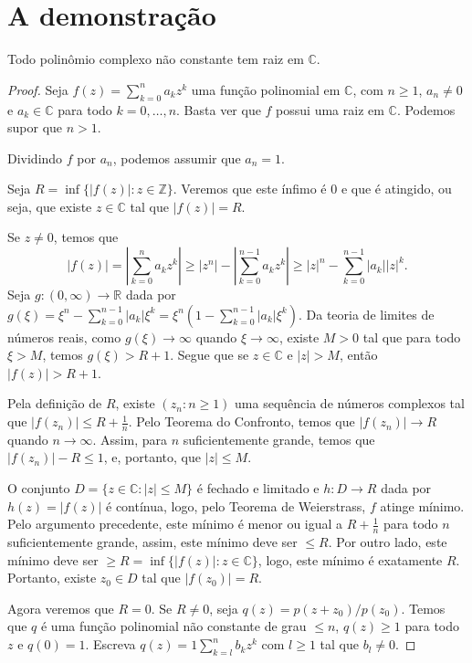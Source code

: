 \section{A demonstração}
\begin{theorem}
    Todo polinômio complexo não constante tem raiz em $\mathbb C$.
\end{theorem}
\begin{proof}
    Seja $f(z)=\sum_{k=0}^n a_k z^k$ uma função polinomial em $\mathbb C$, com $n\geq 1$, $a_n\neq 0$ e $a_k\in \mathbb C$ para todo $k=0,\ldots,n$.
    Basta ver que $f$ possui uma raiz em $\mathbb C$. Podemos supor que $n>1$.

    Dividindo $f$ por $a_n$, podemos assumir que $a_n=1$.

    Seja $R=\inf\{|f(z)|: z \in \mathbb Z\}$. Veremos que este ínfimo é $0$ e que é atingido, ou seja, que existe $z \in \mathbb C$ tal que $|f(z)|=R$.

    Se $z\neq 0$, temos que
    \begin{equation}
    |f(z)|=\left|\sum_{k=0}^n a_k z^k\right|\geq |z^n|-\left|\sum_{k=0}^{n-1}a_k z^k\right|\geq|z|^n-\sum_{k=0}^{n-1}|a_k||z|^k.
    \end{equation}
    Seja $g:(0, \infty)\rightarrow \mathbb R$ dada por $g(\xi)=\xi^n-\sum_{k=0}^{n-1}|a_k|\xi^k=\xi^n(1-\sum_{k=0}^{n-1}|a_k|\xi^k)$.
    Da teoria de limites de números reais, como $g(\xi)\to\infty$ quando $\xi\to \infty$, existe $M>0$ tal que para todo $\xi>M$, temos $g(\xi)>R+1$. Segue que se $z \in \mathbb C$ e $|z|>M$, então $|f(z)|>R+1$.

    Pela definição de $R$, existe $(z_n: n\geq 1)$ uma sequência de números complexos tal que $|f(z_n)|\leq R+\frac{1}{n}$. Pelo Teorema do Confronto, temos que $|f(z_n)|\to R$ quando $n\to \infty$. Assim, para $n$ suficientemente grande, temos que $|f(z_n)|-R\leq 1$, e, portanto, que $|z|\leq M$.

    O conjunto $D=\{z \in \mathbb C: |z|\leq M\}$ é fechado e limitado e $h:D\rightarrow R$ dada por $h(z)=|f(z)|$ é contínua, logo, pelo Teorema de Weierstrass, $f$ atinge mínimo. Pelo argumento precedente, este mínimo é menor ou igual a $R+\frac{1}{n}$ para todo $n$ suficientemente grande, assim, este mínimo deve ser $\leq R$. Por outro lado, este mínimo deve ser $\geq R=\inf\{|f(z)|: z \in \mathbb C\}$, logo, este mínimo é exatamente $R$. Portanto, existe $z_0 \in D$ tal que $|f(z_0)|=R$.

    Agora veremos que $R=0$. Se $R\neq 0$, seja $q(z)=p(z+z_0)/p(z_0)$. Temos que $q$ é uma função polinomial não constante de grau $\leq n$, $q(z)\geq 1$ para todo $z$ e $q(0)=1$. Escreva $q(z)=1\sum_{k=l}^n b_k z^k$ com $l\geq 1$ tal que $b_{l}\neq 0$.


\end{proof}
